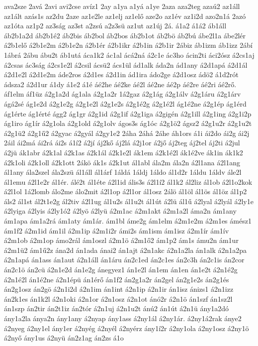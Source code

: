 {ava2sze
2avá
2avi
avi2cse
avíz1
2ay
a1ya
a1yá
a1ye
2aza
aza2teg
azaú2
az1áll
az1ált
azás1s
az2du
2aze
az1e2le
az1elj
az1elő
aze2o
az1év
az1i2d
azo2n1á
2azó
az1óta
az1p2
az3ság
az3st
a2zsú
a2z3sü
az1ut
az1új
2á.
á1a2
á1á2
áb1áll
áb2b1a2d
áb2b1é2
áb2bis
áb2bol
áb2bos
áb2b1ot
áb2bö
áb2bú
ábe2l1a
ábe2lér
á2b1elő
á2b1e2m
á2b1e2n
á2b1ér
á2b1ikr
á2b1in
á2b1ir
2ábiz
áb1izm
áb1izz
2ábí
1ábrá
2ábu
ábu2t
áb1utá
áca1k2
ác1al
ácá2ná
á2c1e
ác3ho
ácin2ti
áci2ósz
á2cs1aj
á2csas
ác3ság
á2cs1e2l
á2csil
ácsü2
ács1ül
ád1alk
áda2n
ád1any
á2d1apá
á2d1ál
á2d1e2l
á2d1e2m
áde2ros
á2d1es
á2d1in
ád1ira
ádo2ge
á2d1osz
ádö2
á1d2rót
ádsza2
á2d1ur
á1dy
á1e2
á1é
áé2he
áé2ke
áé2l
áé2ne
áé2p
áé2re
áé2ri
áé2rő.
áf1elm
áf1üz
á2g1a2d
ág1ala
á2g1a2r
1á2gaz
á2g1ág
á2g1álv
á2g1áru
á2g1árv
ágá2sé
ág1e2d
á2g1e2g
á2g1e2l
á2g1e2s
á2g1é2g
á2g1é2l
ág1é2ne
á2g1ép
ág1érd
ág1érte
ág1érté
ágg2
ág1gr
á2g1id
á2g1if
á2g1iga
á2gigén
á2g1ill
á2g1ing
á2g1i2p
ág1iro
ág1ír
á2g1ola
á2g1old
á2g1olv
ágos3s
ág1óc
á2g1ö2
ágsz2
á2g1u2r
á2g1u2t
á2g1ü2
á2g1ű2
á2gyac
á2gyál
á2gy1e2
2áha
2áhá
2áhe
áh1ors
á1i
ái2do
ái2g
ái2j
2áil
ái2má
ái2rá
ái2s
á1í2
á2jí
áj2kő
áj2lá
á2j1or
á2jő
áj2teg
áj2tel
áj2ti
á2jul
á2jü
ák1abr
á2k1al
á2k1as
á2k1ál
á2k1e2l
ák1em
á2k1é2l
ák1é2ve
ák1in
ák1k2
á2k1oli
á2k1oll
á2k1ott
2ákö
ák1s
á2k1ut
ál1abl
ála2m
ála2n
á2l1ana
á2l1ang
ál1any
ála2szel
ála2szü
ál1áll
ál1árf
1áldá
1áldj
1áldo
ál1d2r
1áldu
1áldv
ále2l
ál1emu
á2l1e2r
ál1ér.
álé2t
ál1éte
á2l1id
ális3s
á2l1í2
ál1k2
ál2liz
ál1ob
á2l1o2kok
á2l1ol
1á2lomb
álo2me
álo2mit
á2l1op
á2l1or
ál1osz
2álö
ál1öl
ál1ös
ál1öz
ál1p2
áls2
ál1st
ál2t1e2g
ál2tiv
á2l1ug
ál1u2s
ál1u2t
ál1út
á2lü
ál1ű
á2lyal
á2lyál
á2ly1e
á2lyiga
á2lyis
á2ly1ó2
á2lyö
á2lyü
á2m1ac
á2m1akt
á2m1a2l
áma2n
ám1any
ám1apa
ám1a2rá
ám1aty
ám1ár.
ám1bl
áme2g
ám1elm
á2m1e2m
á2m1es
ámész1
ám1f2
á2m1id
ám1il
á2m1ip
á2m1i2r
ámi2s
ám1ism
ám1isz
á2m1ír
ám1ív
á2m1ob
á2m1op
ámo2rál
ám1oszl
á2m1ö
á2m1ő2
ám1p2
ám1s
ámu2n
ám1ur
á2m1ü2
ám1ű2z
ána2d
án1ada
ánai2
án1ajt
á2n1akc
á2n1a2la
án1alk
á2n1a2pa
á2n1apá
án1ass
án1aut
á2n1áll
án1áru
án2c1ed
án2c1es
án2c3h
án2c1is
án2cor
án2c1ö
án2cü
á2n1e2d
án1e2g
ánegyez1
án1e2l
án1em
án1en
án1e2t
á2n1é2g
á2n1é2l
án1é2ne
á2n1épü
án1érő
án1f2
án2g1a2r
án2gel
án2g1e2s
án2g1és
án2g1osz
án2gö
á2n1i2d
á2n1im
án1int
á2n1ip
á2n1ir
án1isz
ánizs1
á2n1izz
án2k1es
án1k2l
á2n1oki
á2n1or
á2n1osz
á2n1ot
ánó2r
á2n1ö
án1szf
án1sz2l
án1szp
án2tir
án2t1iz
án2tór
á2n1uj
á2n1u2t
ánú2
án1út
á2n1ü
ány1a2dó
ány1a2la
ánya2n
ány1any
á2nyap
ány1ass
á2ny1ál
á2ny1ár.
á2ny1á2rak
ánye2
á2nyeg
á2ny1el
ány1er
á2nyég
á2nyél
á2nyérz
ány1í2r
á2ny1ola
á2ny1osz
á2ny1ö
á2nyő
ány1us
á2nyü
án2z1ag
án2zs
á1o
}
